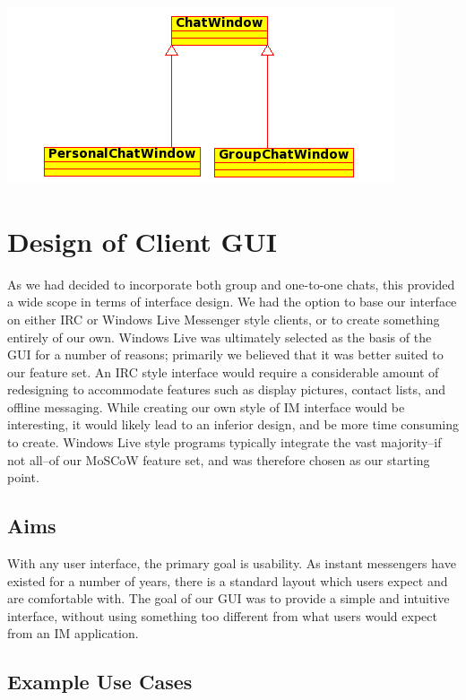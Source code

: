 \includegraphics[scale=0.65]{Design/diagrams/chatwin.png}


\section{Design of Client GUI}
\label{gui_design}

As we had decided to incorporate both group and one-to-one chats, this provided a wide scope in terms of interface design. We had the option to base our interface on either IRC or Windows Live Messenger style clients, or to create something entirely of our own. Windows Live was ultimately selected as the basis of the GUI for a number of reasons; primarily we believed that it was better suited to our feature set. An IRC style interface would require a considerable amount of redesigning to accommodate features such as display pictures, contact lists, and offline messaging. While creating our own style of IM interface would be interesting, it would likely lead to an inferior design, and be more time consuming to create. Windows Live style programs typically integrate the vast majority--if not all--of our MoSCoW feature set, and was therefore chosen as our starting point.

\subsection{Aims}

With any user interface, the primary goal is usability. As instant messengers have existed for a number of years, there is a standard layout which users expect and are comfortable with. The goal of our GUI was to provide a simple and intuitive interface, without using something too different from what users would expect from an IM application.
 
\subsection{Example Use Cases}

